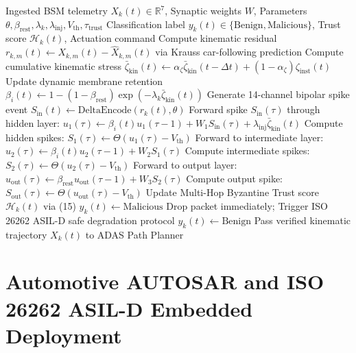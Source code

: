 \documentclass[journal]{IEEEtran}
\begin{document}
\begin{algorithm}[t]
\caption{Neuro-VeReMi Real-Time Misbehavior Detection and Safe Actuation}
\label{alg:neuroveremi_pipeline}
\begin{algorithmic}[1]
\REQUIRE Ingested BSM telemetry $X_k(t) \in \mathbb{R}^7$, Synaptic weights $W$, Parameters $\theta, \beta_{\text{rest}}, \lambda_k, \lambda_{\text{inj}}, V_{\text{th}}, \tau_{\text{trust}}$
\ENSURE Classification label $y_k(t) \in \{\text{Benign}, \text{Malicious}\}$, Trust score $\mathcal{H}_k(t)$, Actuation command
\STATE Compute kinematic residual $r_{k,m}(t) \leftarrow X_{k,m}(t) - \hat{X}_{k,m}(t)$ via Krauss car-following prediction
\STATE Compute cumulative kinematic stress $\bar{\zeta}_{\text{kin}}(t) \leftarrow \alpha_{\zeta} \bar{\zeta}_{\text{kin}}(t - \Delta t) + (1 - \alpha_{\zeta}) \zeta_{\text{inst}}(t)$
\STATE Update dynamic membrane retention $\beta_i(t) \leftarrow 1 - (1 - \beta_{\text{rest}})\exp(-\lambda_k \bar{\zeta}_{\text{kin}}(t))$
\STATE Generate 14-channel bipolar spike event $S_{\text{in}}(t) \leftarrow \text{DeltaEncode}(r_k(t), \theta)$
    \STATE Forward spike $S_{\text{in}}(\tau)$ through hidden layer: $u_1(\tau) \leftarrow \beta_i(t) u_1(\tau-1) + W_1 S_{\text{in}}(\tau) + \lambda_{\text{inj}}\bar{\zeta}_{\text{kin}}(t)$
    \STATE Compute hidden spikes: $S_1(\tau) \leftarrow \Theta(u_1(\tau) - V_{\text{th}})$
    \STATE Forward to intermediate layer: $u_2(\tau) \leftarrow \beta_i(t) u_2(\tau-1) + W_2 S_1(\tau)$
    \STATE Compute intermediate spikes: $S_2(\tau) \leftarrow \Theta(u_2(\tau) - V_{\text{th}})$
    \STATE Forward to output layer: $u_{\text{out}}(\tau) \leftarrow \beta_{\text{rest}} u_{\text{out}}(\tau-1) + W_3 S_2(\tau)$
    \STATE Compute output spike: $S_{\text{out}}(\tau) \leftarrow \Theta(u_{\text{out}}(\tau) - V_{\text{th}})$
\ENDFOR
\STATE Update Multi-Hop Byzantine Trust score $\mathcal{H}_k(t)$ via (15)
    \STATE $y_k(t) \leftarrow \text{Malicious}$
    \STATE Drop packet immediately; Trigger ISO 26262 ASIL-D safe degradation protocol
\ELSE
    \STATE $y_k(t) \leftarrow \text{Benign}$
    \STATE Pass verified kinematic trajectory $X_k(t)$ to ADAS Path Planner
\ENDIF
\end{algorithmic}
\end{algorithm}

\section{Automotive AUTOSAR and ISO 26262 ASIL-D Embedded Deployment}
\end{document}
